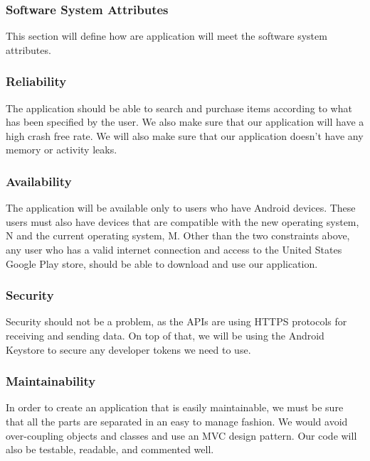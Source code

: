 \documentclass[journal,compsoc, 10pt, draftclsnofoot, onecolumn]{IEEEtran}
\begin{document}
\subsubsection{Software System Attributes}

This section will define how are application will meet the software system 
attributes.

\subsubsection*{Reliability}

The application should be able to search and purchase items according to what 
has been specified by the user. We also make sure that our application will 
have a high crash free rate. We will also make sure that our application doesn't
 have any memory or activity leaks.

\subsubsection*{Availability}

The application will be available only to users who have Android devices. These 
users must also have devices that are compatible with the new operating system, 
N and the current operating system, M. Other than the two constraints above, 
any user who has a valid internet connection and access to the United 
States Google Play store, should be able to download and use our application.

\subsubsection*{Security}

Security should not be a problem, as the APIs are using HTTPS protocols for 
receiving and sending data. On top of that, we will be using the Android 
Keystore to secure any developer tokens we need to use.

\subsubsection*{Maintainability}

In order to create an application that is easily maintainable, we must be sure 
that all the parts are separated in an easy to manage fashion. We would avoid 
over-coupling objects and classes and use an MVC design pattern. Our code 
will also be testable, readable, and commented well.
\end{document}
